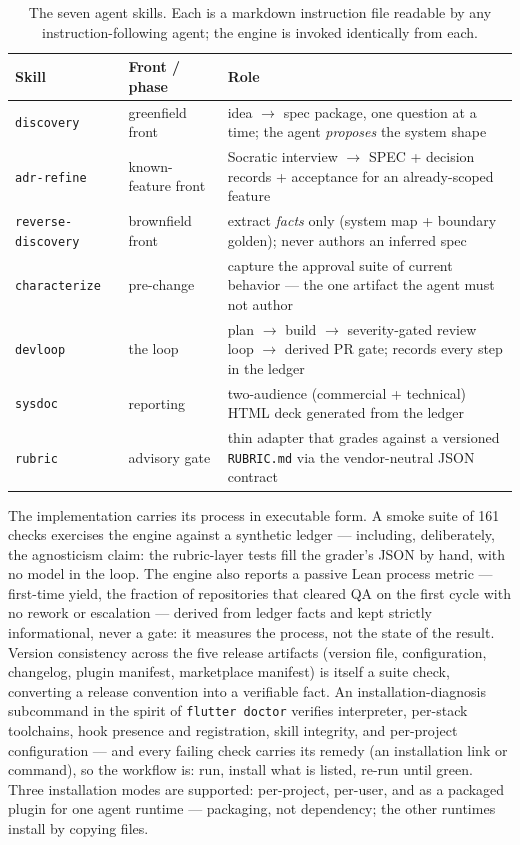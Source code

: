 \documentclass[11pt]{article}
\begin{document}
\begin{table}[t]
\centering
\small
\begin{tabular}{@{}llp{6.4cm}@{}}
\toprule
\textbf{Skill} & \textbf{Front / phase} & \textbf{Role} \\
\midrule
\texttt{discovery} & greenfield front & idea $\to$ spec package, one question
at a time; the agent \emph{proposes} the system shape \\
\texttt{adr-refine} & known-feature front & Socratic interview $\to$ SPEC +
decision records + acceptance for an already-scoped feature \\
\texttt{reverse-discovery} & brownfield front & extract \emph{facts} only
(system map + boundary golden); never authors an inferred spec \\
\texttt{characterize} & pre-change & capture the approval suite of current
behavior --- the one artifact the agent must not author \\
\texttt{devloop} & the loop & plan $\to$ build $\to$ severity-gated review loop
$\to$ derived PR gate; records every step in the ledger \\
\texttt{sysdoc} & reporting & two-audience (commercial + technical) HTML deck
generated from the ledger \\
\texttt{rubric} & advisory gate & thin adapter that grades against a versioned
\texttt{RUBRIC.md} via the vendor-neutral JSON contract \\
\bottomrule
\end{tabular}
\caption{The seven agent skills. Each is a markdown instruction file readable by
any instruction-following agent; the engine is invoked identically from each.}
\label{tab:skills}
\end{table}

The implementation carries its process in executable form. A smoke suite of
161 checks exercises the engine against a synthetic ledger --- including,
deliberately, the agnosticism claim: the rubric-layer tests fill the grader's
JSON by hand, with no model in the loop. The engine also reports a passive Lean
process metric --- first-time yield, the fraction of repositories that cleared
QA on the first cycle with no rework or escalation --- derived from ledger facts
and kept strictly informational, never a gate: it measures the process, not the
state of the result. Version consistency across the five
release artifacts (version file, configuration, changelog, plugin manifest,
marketplace manifest) is itself a suite check, converting a release convention
into a verifiable fact. An installation-diagnosis subcommand in the spirit of
\texttt{flutter doctor} verifies interpreter, per-stack toolchains, hook
presence and registration, skill integrity, and per-project configuration ---
and every failing check carries its remedy (an installation link or command),
so the workflow is: run, install what is listed, re-run until green. Three
installation modes are supported: per-project, per-user, and as a packaged
plugin for one agent runtime --- packaging, not dependency; the other runtimes
install by copying files.
\end{document}
